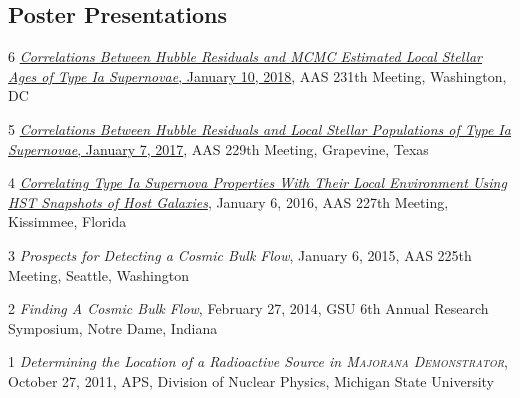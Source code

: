 \documentclass[margin]{res}
\begin{document}
\begin{resume}
\section{Poster Presentations}


\hangindent=15pt {\footnotesize \textcolor{light-gray}{6}} \href{https://ui.adsabs.harvard.edu/#abs/2018AAS...23124512R/abstract}{{\sl Correlations Between Hubble Residuals and MCMC Estimated Local Stellar Ages of Type Ia Supernovae}, January 10, 2018}, AAS 231th Meeting, Washington, DC
\vspace{-12pt}


\hangindent=15pt {\footnotesize \textcolor{light-gray}{5}} \href{https://ui.adsabs.harvard.edu/#abs/2017AAS...22943402R/abstract}{{\sl Correlations Between Hubble Residuals and Local Stellar Populations of Type Ia Supernovae}, January 7, 2017}, AAS 229th Meeting, Grapevine, Texas
\vspace{-12pt}

\hangindent=15pt {\footnotesize \textcolor{light-gray}{4}} \href{https://ui.adsabs.harvard.edu/#abs/2016AAS...22723711R/abstract}{{\sl Correlating Type Ia Supernova Properties With Their Local Environment Using HST Snapshots of Host Galaxies}}, January 6, 2016, AAS 227th Meeting, Kissimmee, Florida
\vspace{-12pt}

\hangindent=15pt {\footnotesize \textcolor{light-gray}{3}} 
{\sl Prospects for Detecting a Cosmic Bulk Flow},  January 6, 2015, AAS 225th Meeting, Seattle, Washington 
\vspace{-12pt}

\hangindent=15pt {\footnotesize \textcolor{light-gray}{2}} 
{\sl Finding A Cosmic Bulk Flow}, February 27, 2014, GSU 6th Annual Research Symposium, Notre Dame, Indiana
\vspace{-12pt}

\hangindent=15pt {\footnotesize \textcolor{light-gray}{1}} 
{\sl Determining the Location of a Radioactive Source in \textsc{Majorana Demonstrator}}, October 27, 2011, APS, Division of Nuclear Physics, Michigan State University 


\begin{comment}
\href{https://ui.adsabs.harvard.edu/#abs/2017AAS...22943402R/abstract}{{\sl Correlations Between Hubble Residuals and Local Stellar Populations}} \hfill {\bf January 7, 2017} \\
\textit{of Type Ia Supernovae}\\
AAS 229th Meeting, Grapevine, Texas


\end{comment}
\end{resume}
\end{document}
